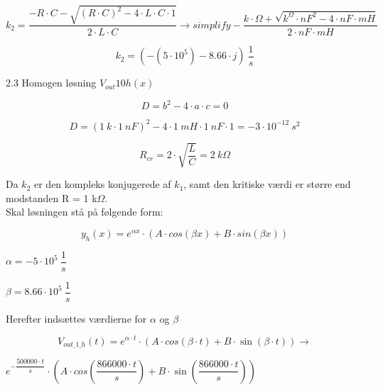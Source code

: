 \begin{equation}
	k_{2} = \dfrac{ -R\cdot C- \sqrt{ \left(R\cdot C\right) ^{2}-4\cdot L\cdot C\cdot 1} }{2\cdot L\cdot C} \rightarrow{simplify}
	 -\dfrac{k\cdot \Omega+ \sqrt{k^{\Omega}\cdot nF^{2}-4\cdot nF\cdot mH} }{2\cdot nF\cdot mH}
\end{equation}

\begin{equation}
	k_{2} =  \left( - \left(5\cdot 10^{5}\right) -8.66\cdot j\right) \ \dfrac{1}{s}
\end{equation} 

2.3 Homogen løsning $V_{out}{10}h(x)$

\begin{equation}
D = b^2 - 4\cdot a\cdot c = 0
\end{equation}

\begin{equation}
	D =  \left(1\ k\cdot 1\ nF\right) ^{2}-4\cdot 1\ mH\cdot 1\ nF\cdot 1 =  -3\cdot 10^{ -12}\ s^{2}
\end{equation}

\begin{equation}
	R_{cr} = 2\cdot  \sqrt{\dfrac{L}{C}}  = 2\ k\Omega
\end{equation}

Da $k_2$ er den kompleks konjugerede af $k_1$, samt den kritiske værdi er større end modstanden R = 1 k$\Omega$. \\
Skal løsningen stå på følgende form:

\begin{equation}
y_h(x)=e^{\alpha x} \cdot (A \cdot cos (\beta x) + B\cdot sin(\beta x))
\end{equation}

\begin{center}
\begin{minipage}{.2\linewidth}
$\alpha =  -5\cdot 10^{5}\ \dfrac{1}{s}$
\end{minipage}
\begin{minipage}{.2\linewidth}
$\beta = 8.66\cdot 10^{5}\ \dfrac{1}{s}$
\end{minipage}
\end{center}

Herefter indsættes værdierne for $\alpha$ og $\beta$

\begin{equation}
	V_{out\_1\_h} \left(t\right)  = e^{\alpha\cdot t}\cdot  \left(A\cdot cos  \left(\beta\cdot t\right) +B\cdot \sin  \left(\beta\cdot t\right) \right)  \xrightarrow{}
	\label{Homegen1K}
	\end{equation}
	\begin{center}
	$ e^{ -\dfrac{500000\cdot t}{s}}\cdot  \left(A\cdot cos  \left(\dfrac{866000\cdot t}{s}\right) +B\cdot \sin  \left(\dfrac{866000\cdot t}{s}\right) \right)$
	
	\end{center}



